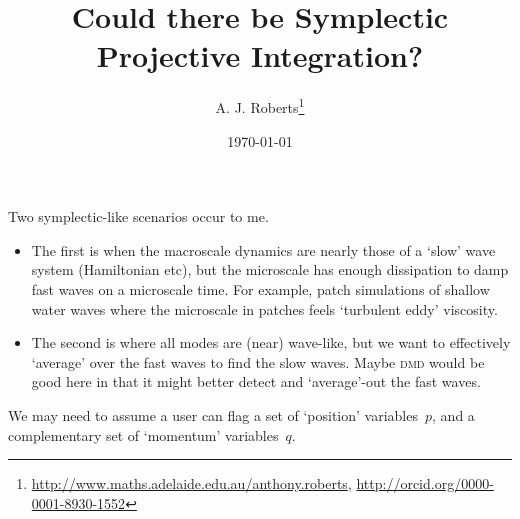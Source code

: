 \documentclass[11pt,a5paper]{article}
\title{Could there be Symplectic Projective Integration?}
\author{A. J. Roberts\thanks{%
\url{http://www.maths.adelaide.edu.au/anthony.roberts},
\url{http://orcid.org/0000-0001-8930-1552}}}
\date{\today}
\begin{document}
\maketitle

Two symplectic-like scenarios occur to me.  \begin{itemize}
\item The first is when the macroscale dynamics are nearly those of a `slow' wave system (Hamiltonian etc), but the microscale has enough dissipation to damp fast waves on a microscale time.
For example, patch simulations of shallow water waves where the microscale in patches feels `turbulent eddy' viscosity.
\item The second is where all modes are (near) wave-like, but we want to effectively `average' over the fast waves to find the slow waves.
Maybe \textsc{dmd} would be good here in that it might better detect and `average'-out the fast waves.
\end{itemize}

We may need to assume a user can flag a set of `position' variables~\(p\), and a complementary set of `momentum' variables~\(q\).
\end{document}
